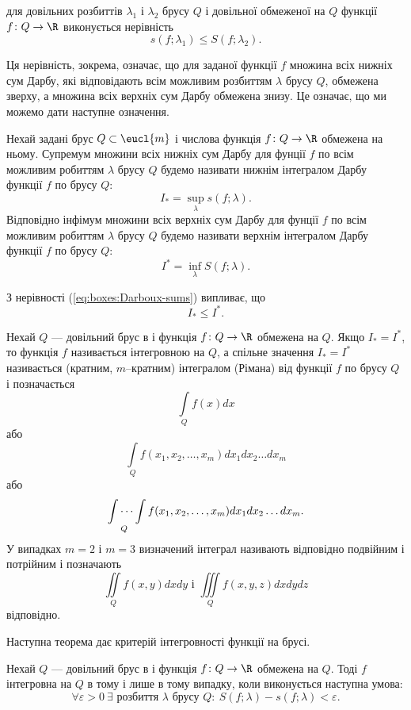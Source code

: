 \begin{intextProposition}
для довільних розбиттів ${\lambda_1}$ і ${\lambda_2}$ брусу $Q$ і довільної обмеженої на $Q$ функції ${f\colon Q \to \R}$ виконується нерівність
\begin{equation}\label{eq:boxes:Darboux-sums}
s\left(f;\lambda_1\right) \leq S\left(f;\lambda_2\right).
\end{equation}
\end{intextProposition}
Ця нерівність, зокрема, означає, що для заданої функції $f$ множина всіх нижніх сум Дарбу, які відповідають всім можливим розбиттям $\lambda$ брусу $Q$, обмежена зверху, а множина всіх верхніх сум Дарбу обмежена знизу. Це означає, що ми можемо дати наступне означення.
\begin{definition}
Нехай задані брус ${Q\subset\eucl{m}}$ і числова функція ${f\colon Q \to \R}$ обмежена на ньому. Супремум множини всіх нижніх сум Дарбу для фунції $f$ по всім можливим робиттям $\lambda$ брусу $Q$ будемо називати нижнім інтегралом Дарбу функції $f$ по брусу $Q$:
\[
I_* = \sup\limits_{\lambda}s\left(f;\lambda\right).
\]
Відповідно інфімум множини всіх верхніх сум Дарбу для фунції $f$ по всім можливим робиттям $\lambda$ брусу $Q$ будемо називати верхнім інтегралом Дарбу функції $f$ по брусу $Q$:
\[
I^* = \inf\limits_{\lambda}S\left(f;\lambda\right).
\]
\end{definition}
З нерівності (\ref{eq:boxes:Darboux-sums}) випливає, що
\[
I_* \leq I^*.
\]
\begin{definition}
Нехай $Q$ --- довільний брус в  і функція ${f\colon Q\to\R}$ обмежена на $Q$. Якщо ${I_* = I^*}$, то функція $f$ називається інтегровною на $Q$, а спільне значення ${I_* = I^*}$ називається (кратним, $m$--кратним) інтегралом (Рімана) від функції $f$ по брусу $Q$ і позначається
\[
\int\limits_Qf(x) d x
\]
або
\[
\int\limits_Qf(x_1, x_2, \ldots, x_m) d x_1 d x_2 \ldots d x_m
\]
або
\[
\idotsint\limits_Qf(x_1, x_2, \ldots, x_m) d x_1 d x_2 \ldots d x_m.
\]
У випадках ${m=2}$ і ${m=3}$ визначений інтеграл називають відповідно подвійним і потрійним і позначають
\[
\iint\limits_Qf(x, y) d x d y \mbox{ і } \iiint\limits_Qf(x, y, z) d x d y d z
\]
відповідно.
\end{definition}
Наступна теорема дає критерій інтегровності функції на брусі.
\begin{theorem}
Нехай $Q$ --- довільний брус в  і функція ${f\colon Q\to\R}$ обмежена на $Q$. Тоді $f$ інтегровна на $Q$ в тому і лише в тому випадку, коли виконується наступна умова:
\[
\forall \varepsilon > 0\ \exists \mbox{ розбиття }\lambda \mbox{ брусу } Q: \ S\left(f;\lambda\right) - s\left(f;\lambda\right) < \varepsilon.
\]
\end{theorem}
